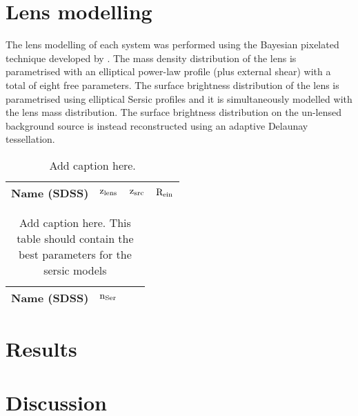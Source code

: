 \documentclass[a4paper,fleqn,usenatbib]{mnras}
\begin{document}
\section{Lens modelling}
The lens modelling of each system was performed using the Bayesian pixelated technique developed by \citet{V09} \citep[see also][]{V14a}.
The mass density distribution of the lens is parametrised with an elliptical power-law profile (plus external shear) with a total of eight free parameters. The surface brightness distribution of the lens is parametrised using elliptical Sersic profiles and it is simultaneously modelled with the lens mass distribution. The surface brightness distribution on the un-lensed background source is instead reconstructed using an adaptive Delaunay tessellation.


\begin{table*}
\caption{Add caption here.}
\begin{tabular}{cccc}
\hline
 Name (SDSS) &$\rm{z_{lens}}$&$\rm{z_{src}}$&$\rm{R_{ein}}$\\
 \hline

 \hline
\end{tabular}
\label{tbl:list} 
\end{table*}


\begin{table*}
\caption{Add caption here. This table should contain the best parameters for the sersic models}
\begin{tabular}{cccc}
\hline
 Name (SDSS) &$\rm{n_{Ser}}$\\
 \hline

 \hline
\end{tabular}
\label{tbl:sersic} 
\end{table*}

\section{Results}

\section{Discussion}

%
\end{document}
